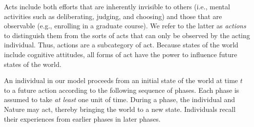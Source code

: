 \documentclass[
11pt,
titlepage,
reqno,
]{article}%
\theoremstyle{definition}
\begin{document}
Acts include both efforts that are inherently invisible to others (i.e., mental activities such as deliberating, judging, and choosing) and those that are observable (e.g., enrolling in a graduate course).
We refer to the latter as \textit{actions} to distinguish them from the sorts of acts that can only be observed by the acting individual. 
Thus, actions are a subcategory of act.
Because states of the world include cognitive attitudes, all forms of act have the power to influence future states of the world.

An individual in our model proceeds from an initial state of the world at time $t$ to a future action according to the following sequence of phases. 
Each phase is assumed to take \textit{at least} one unit of time. 
During a phase, the individual and Nature may act, thereby bringing the world to a new state. Individuals recall their experiences from earlier phases in later phases.
\end{document}
